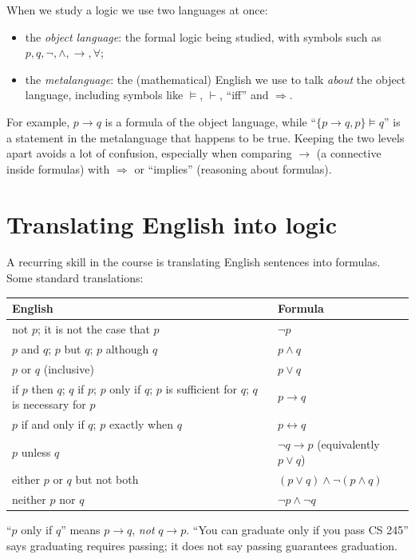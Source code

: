 When we study a logic we use two languages at once:
\begin{itemize}
  \item the \emph{object language}: the formal logic being studied, with symbols such as
        $p, q, \neg, \land, \to, \forall$;
  \item the \emph{metalanguage}: the (mathematical) English we use to talk \emph{about}
        the object language, including symbols like $\models$, $\vdash$, ``iff'' and
        $\Rightarrow$.
\end{itemize}
For example, $p \to q$ is a formula of the object language, while
``$\{p\to q, p\} \models q$'' is a statement in the metalanguage that happens to be true.
Keeping the two levels apart avoids a lot of confusion, especially when comparing $\to$
(a connective inside formulas) with $\Rightarrow$ or ``implies'' (reasoning about
formulas).

\section{Translating English into logic}

A recurring skill in the course is translating English sentences into formulas. Some
standard translations:

\begin{center}
\begin{tabular}{p{}l}
\toprule
English & Formula \\
\midrule
not $p$; it is not the case that $p$ & $\neg p$ \\
$p$ and $q$; $p$ but $q$; $p$ although $q$ & $p \land q$ \\
$p$ or $q$ (inclusive) & $p \lor q$ \\
if $p$ then $q$; $q$ if $p$; $p$ only if $q$; $p$ is sufficient for $q$;
  $q$ is necessary for $p$ & $p \to q$ \\
$p$ if and only if $q$; $p$ exactly when $q$ & $p \leftrightarrow q$ \\
$p$ unless $q$ & $\neg q \to p$ (equivalently $p \lor q$) \\
either $p$ or $q$ but not both & $(p\lor q)\land\neg(p\land q)$ \\
neither $p$ nor $q$ & $\neg p \land \neg q$ \\
\bottomrule
\end{tabular}
\end{center}

\begin{important}
``$p$ only if $q$'' means $p \to q$, \emph{not} $q \to p$. ``You can graduate only if you
pass CS 245'' says graduating requires passing; it does not say passing guarantees
graduation.
\end{important}

